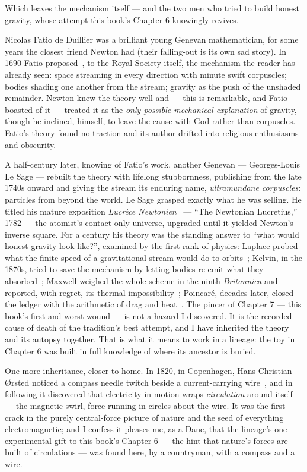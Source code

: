 \documentclass[fontsize=11pt,paper=a4,pagesize=auto,parskip=half-]{scrbook}
\begin{document}
Which leaves the mechanism itself --- and the two men who tried to build honest gravity, whose attempt this book's Chapter 6 knowingly revives.

Nicolas Fatio de Duillier was a brilliant young Genevan mathematician, for some years the closest friend Newton had (their falling-out is its own sad story). In 1690 Fatio proposed~\cite{fatio1690}, to the Royal Society itself, the mechanism the reader has already seen: space streaming in every direction with minute swift corpuscles; bodies shading one another from the stream; gravity as the push of the unshaded remainder. Newton knew the theory well and --- this is remarkable, and Fatio boasted of it --- treated it as the \emph{only possible mechanical explanation} of gravity, though he inclined, himself, to leave the cause with God rather than corpuscles. Fatio's theory found no traction and its author drifted into religious enthusiasms and obscurity.

A half-century later, knowing of Fatio's work, another Genevan --- Georges-Louis Le Sage --- rebuilt the theory with lifelong stubbornness, publishing from the late 1740s onward and giving the stream its enduring name, \emph{ultramundane corpuscles}: particles from beyond the world. Le Sage grasped exactly what he was selling. He titled his mature exposition \emph{Lucrèce Newtonien}~\cite{lesage1782} --- ``The Newtonian Lucretius,'' 1782 --- the atomist's contact-only universe, upgraded until it yielded Newton's inverse square. For a century his theory was the standing answer to ``what would honest gravity look like?'', examined by the first rank of physics: Laplace probed what the finite speed of a gravitational stream would do to orbits~\cite{laplace1805}; Kelvin, in the 1870s, tried to save the mechanism by letting bodies re-emit what they absorbed~\cite{kelvin1873}; Maxwell weighed the whole scheme in the ninth \emph{Britannica} and reported, with regret, its thermal impossibility~\cite{maxwell1875}; Poincaré, decades later, closed the ledger with the arithmetic of drag and heat~\cite{poincare1908}. The pincer of Chapter 7 --- this book's first and worst wound --- is not a hazard I discovered. It is the recorded cause of death of the tradition's best attempt, and I have inherited the theory and its autopsy together. That is what it means to work in a lineage: the toy in Chapter 6 was built in full knowledge of where its ancestor is buried.

One more inheritance, closer to home. In 1820, in Copenhagen, Hans Christian Ørsted noticed a compass needle twitch beside a current-carrying wire~\cite{oersted1820}, and in following it discovered that electricity in motion wraps \emph{circulation} around itself --- the magnetic swirl, force running in circles about the wire. It was the first crack in the purely central-force picture of nature and the seed of everything electromagnetic; and I confess it pleases me, as a Dane, that the lineage's one experimental gift to this book's Chapter 6 --- the hint that nature's forces are built of circulations --- was found here, by a countryman, with a compass and a wire.
\end{document}
